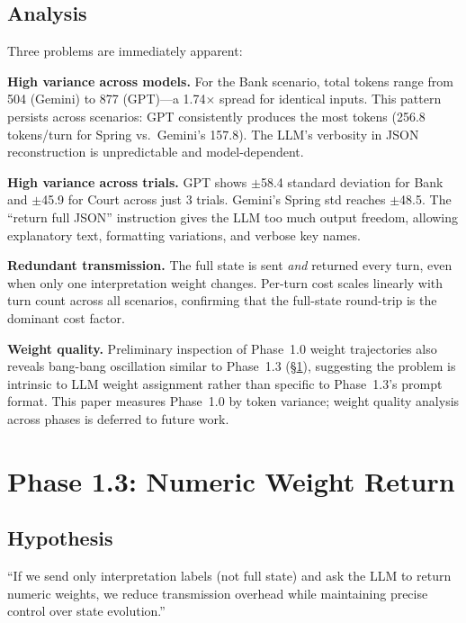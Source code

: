 \documentclass[11pt,a4paper]{article}
\begin{document}
\subsection{Analysis}

Three problems are immediately apparent:

\textbf{High variance across models.} For the Bank scenario, total tokens range from 504 (Gemini) to
877 (GPT)---a 1.74$\times$ spread for identical inputs. This pattern persists across scenarios:
GPT consistently produces the most tokens (256.8 tokens/turn for Spring vs.\ Gemini's 157.8).
The LLM's verbosity in JSON reconstruction is unpredictable and model-dependent.

\textbf{High variance across trials.} GPT shows $\pm$58.4 standard deviation for Bank
and $\pm$45.9 for Court across just 3 trials. Gemini's Spring std reaches $\pm$48.5.
The ``return full JSON'' instruction gives the LLM too much output freedom, allowing
explanatory text, formatting variations, and verbose key names.

\textbf{Redundant transmission.} The full state is sent \textit{and} returned
every turn, even when only one interpretation weight changes. Per-turn cost scales
linearly with turn count across all scenarios, confirming that the full-state
round-trip is the dominant cost factor.

\textbf{Weight quality.} Preliminary inspection of Phase~1.0 weight trajectories
also reveals bang-bang oscillation similar to Phase~1.3 (§\ref{sec:phase1_3}),
suggesting the problem is intrinsic to LLM weight assignment rather than specific
to Phase~1.3's prompt format. This paper measures Phase~1.0 by token variance;
weight quality analysis across phases is deferred to future work.

\section{Phase 1.3: Numeric Weight Return}
\label{sec:phase1_3}

\subsection{Hypothesis}

``If we send only interpretation labels (not full state) and ask the LLM to return
numeric weights, we reduce transmission overhead while maintaining precise control
over state evolution.''
\end{document}
